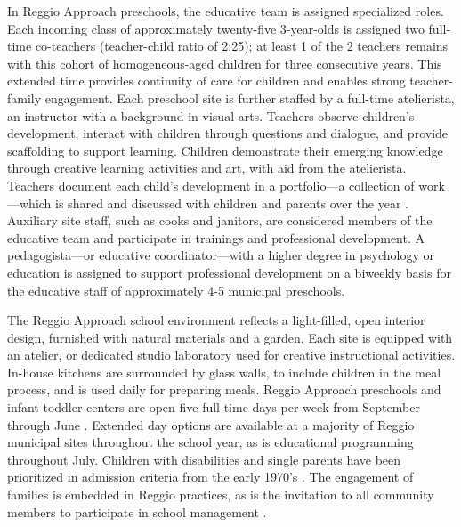 In Reggio Approach preschools, the educative team is assigned specialized roles. Each incoming class of approximately twenty-five 3-year-olds is assigned two full-time co-teachers (teacher-child ratio of 2:25); at least 1 of the 2 teachers remains with this cohort of homogeneous-aged children for three consecutive years. This extended time provides continuity of care for children and enables strong teacher-family engagement. Each preschool site is further staffed by a full-time atelierista, an instructor with a background in visual arts. Teachers observe children's development, interact with children through questions and dialogue, and provide scaffolding to support learning. Children demonstrate their emerging knowledge through creative learning activities and art, with aid from the atelierista. Teachers document each child's development in a portfolio---a collection of work---which is shared and discussed with children and parents over the year \citep{Rinaldi_2006_ReggioEmilia_BOOK,Giudici-Nicolosi_2014_Reggio-Approach}. Auxiliary site staff, such as cooks and janitors, are considered members of the educative team and participate in trainings and professional development. A pedagogista---or educative coordinator---with a higher degree in psychology or education is assigned to support professional development on a biweekly basis for the educative staff of approximately 4-5 municipal preschools. 

The Reggio Approach school environment reflects a light-filled, open interior design, furnished with natural materials and a garden. Each site is equipped with an atelier, or dedicated studio laboratory used for creative instructional activities. In-house kitchens are surrounded by glass walls, to include children in the meal process, and is used daily for preparing meals. Reggio Approach preschools and infant-toddler centers are open five full-time days per week from September through June \citep{Giudici-Nicolosi_2014_Reggio-Approach}. Extended day options are available at a majority of Reggio municipal sites throughout the school year, as is educational programming throughout July. Children with disabilities and single parents have been prioritized in admission criteria from the early 1970's \citep{Edwards-etal-eds_1998_Hundred-Languages}. The engagement of families is embedded in Reggio practices, as is the invitation to all community members to participate in school management \citep{CEHD_2016_Historical-Analysis,Cagliari-etal-eds_2016_BOOK_Loris-Malaguzzi}. 



